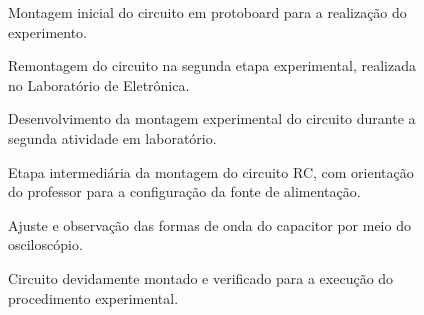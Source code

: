\documentclass[12pt,a4paper]{article}
\begin{document}
\begin{figure}[H]
    \centering
    \caption{Montagem inicial do circuito em protoboard para a realização do experimento.}
    \label{fig:foto01}
\end{figure}

\begin{figure}[H]
    \centering
    \caption{Remontagem do circuito na segunda etapa experimental, realizada no Laboratório de Eletrônica.}
    \label{fig:foto02}
\end{figure}

\begin{figure}[H]
    \centering
    \caption{Desenvolvimento da montagem experimental do circuito durante a segunda atividade em laboratório.}
    \label{fig:foto03}
\end{figure}

\begin{figure}[H]
    \centering
    \caption{Etapa intermediária da montagem do circuito RC, com orientação do professor para a configuração da fonte de alimentação.}
    \label{fig:foto04}
\end{figure}

\begin{figure}[H]
    \centering
    \caption{Ajuste e observação das formas de onda do capacitor por meio do osciloscópio.}
    \label{fig:foto05}
\end{figure}

\begin{figure}[H]
    \centering
    \caption{Circuito devidamente montado e verificado para a execução do procedimento experimental.}
    \label{fig:foto06}
\end{figure}
\end{document}
